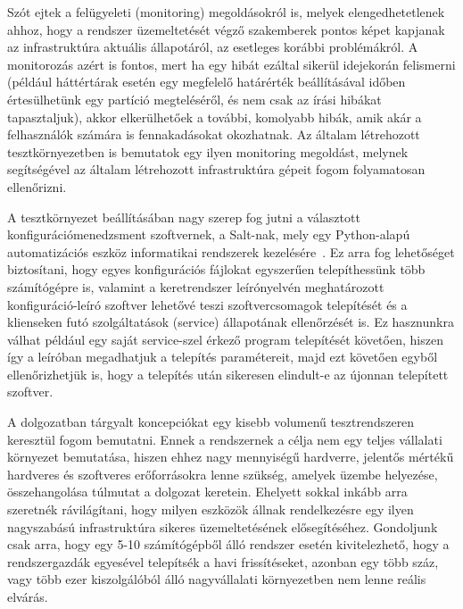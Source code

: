 Szót ejtek a felügyeleti (monitoring) megoldásokról is, melyek elengedhetetlenek ahhoz, hogy a rendszer üzemeltetését végző szakemberek pontos képet kapjanak az infrastruktúra aktuális állapotáról, az esetleges korábbi problémákról. A monitorozás azért is fontos, mert ha egy hibát ezáltal sikerül idejekorán felismerni (például háttértárak esetén egy megfelelő határérték beállításával időben értesülhetünk egy partíció megteléséről, és nem csak az írási hibákat tapasztaljuk), akkor elkerülhetőek a további, komolyabb hibák, amik akár a felhasználók számára is fennakadásokat okozhatnak. Az általam létrehozott tesztkörnyezetben is bemutatok egy ilyen monitoring megoldást, melynek segítségével az általam létrehozott infrastruktúra gépeit fogom folyamatosan ellenőrizni.

A tesztkörnyezet beállításában nagy szerep fog jutni a választott konfigurációmenedzsment szoftvernek, a Salt-nak, mely egy Python-alapú automatizációs eszköz informatikai rendszerek kezelésére~\cite{SaltAbout}. Ez arra fog lehetőséget biztosítani, hogy egyes konfigurációs \mbox{fájlokat} egyszerűen telepíthessünk több számítógépre is, valamint a keretrendszer leírónyelvén meghatározott konfiguráció-leíró szoftver lehetővé teszi szoftvercsomagok telepítését és a klienseken futó szolgáltatások (service) állapotának ellenőrzését is. Ez hasznunkra válhat például egy saját service-szel érkező program telepítését követően, hiszen így a leíróban megadhatjuk a telepítés paramétereit, majd ezt követően egyből ellenőrizhetjük is, hogy a telepítés után sikeresen elindult-e az újonnan telepített szoftver.


A dolgozatban tárgyalt koncepciókat egy kisebb volumenű tesztrendszeren keresztül fogom bemutatni. Ennek a rendszernek a célja nem egy teljes vállalati környezet bemutatása, hiszen ehhez nagy mennyiségű hardverre, jelentős mértékű hardveres és szoftveres erőforrásokra lenne szükség, amelyek üzembe helyezése, összehangolása túlmutat a dolgozat keretein.
Ehelyett sokkal inkább arra szeretnék rávilágítani, hogy milyen eszközök állnak rendelkezésre egy ilyen nagyszabású infrastruktúra sikeres üzemeltetésének elősegítéséhez. Gondoljunk csak arra, hogy egy 5-10 számítógépből álló rendszer esetén kivitelezhető, hogy a rendszergazdák egyesével telepítsék a havi frissítéseket, azonban egy több száz, vagy több ezer kiszolgálóból álló nagyvállalati környezetben nem lenne reális elvárás.

